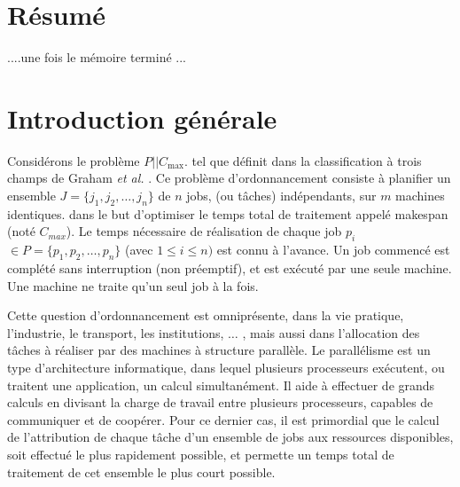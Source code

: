 \documentclass[a4paper,12pt]{report}
\theoremstyle{plain}				%
\theoremstyle{definition}				%
\newcommand\problemGrahamP{$P||C_{\max}$\xspace}
\begin{document}
\bigskip
{}
\section*{Résumé} \label{sec:resume}
....une fois le mémoire terminé ...

\bigskip


\section{Introduction générale} \label{sec:introductionGenerale}

Considérons le problème \problemGrahamP. tel que définit 
  dans la classification à trois champs de 
  Graham \emph{et al.} \cite{graham1979optimization}. 
Ce problème d'ordonnancement consiste à planifier 
  un ensemble $J=\{j_1, j_2, \ldots, j_n\}$ de $n$ jobs, (ou tâches) indépendants, 
  sur $m$ machines identiques. 
  dans le but d'optimiser le temps total de traitement appelé makespan 
  (noté $C_{max}$).
Le temps nécessaire de réalisation de chaque job $p_i$ $\in P=\{p_1, p_2, \ldots, p_n\}$  (avec $1 \leq i \leq n)$ 
  est connu à l'avance. 
Un job commencé est complété sans interruption (non préemptif), 
  et est exécuté par une seule machine. 
Une machine ne traite qu'un seul job à la fois. 

Cette question d’ordonnancement est omniprésente, dans la vie 
  pratique, l'industrie, le transport, les institutions, $\ldots$ , 
  mais aussi dans l'allocation des tâches à réaliser par des 
  machines à structure parallèle. 
Le parallélisme est un type d'architecture informatique, dans lequel 
  plusieurs processeurs exécutent, ou traitent
  une application, un calcul simultanément. 
Il aide à effectuer de grands calculs en divisant la charge de travail 
  entre plusieurs processeurs, capables de communiquer et de coopérer. 
Pour ce dernier cas, il est primordial que le calcul de l'attribution 
  de chaque tâche d'un ensemble de jobs aux ressources disponibles, 
  soit effectué le plus rapidement possible, 
  et permette un temps total de traitement de cet ensemble 
  le plus court possible.
\end{document}
